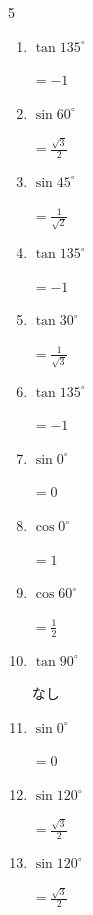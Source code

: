 \begin{multicols}{5}
\begin{enumerate}
        $\displaystyle =\sqrt{3}$

  \item $\displaystyle \tan{135^\circ}$

        $\displaystyle =-1$

  \item $\displaystyle \sin{60^\circ}$

        $\displaystyle =\frac{\sqrt{3}}{2}$

  \item $\displaystyle \sin{45^\circ}$

        $\displaystyle =\frac{1}{\sqrt{2}}$

  \item $\displaystyle \tan{135^\circ}$

        $\displaystyle =-1$

  \item $\displaystyle \tan{30^\circ}$

        $\displaystyle =\frac{1}{\sqrt{3}}$

  \item $\displaystyle \tan{135^\circ}$

        $\displaystyle =-1$

  \item $\displaystyle \sin{0^\circ}$

        $\displaystyle =0$

  \item $\displaystyle \cos{0^\circ}$

        $\displaystyle =1$

  \item $\displaystyle \cos{60^\circ}$

        $\displaystyle =\frac{1}{2}$

  \item $\displaystyle \tan{90^\circ}$

        $\displaystyle なし$

  \item $\displaystyle \sin{0^\circ}$

        $\displaystyle =0$

  \item $\displaystyle \sin{120^\circ}$

        $\displaystyle =\frac{\sqrt{3}}{2}$

\columnbreak %

  \item $\displaystyle \sin{120^\circ}$

        $\displaystyle =\frac{\sqrt{3}}{2}$


\end{enumerate}
\end{multicols}
